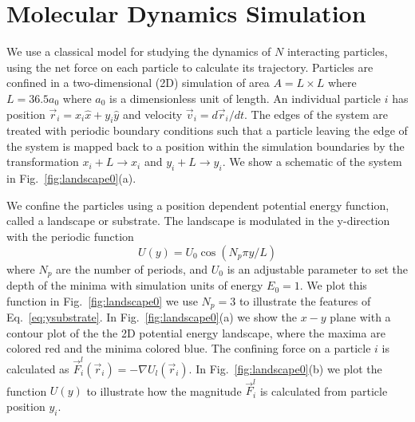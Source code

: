 \documentclass[twocolumn,preprintnumbers,amsmath,amssymb,aps,prx]{revtex4}
\begin{document}

\section{Molecular Dynamics Simulation}
\label{sec:MD}

We use a classical model for 
studying the dynamics of $N$ interacting particles,
using the net force on each particle to calculate
its trajectory.
Particles are confined in a two-dimensional (2D) 
simulation of area $A = L \times L$ where $L=36.5 a_0$
where $a_0$ is a dimensionless unit of length.
An individual particle $i$ has
position $\vec{r}_i = x_i \hat{x} + y_i \hat{y}$
and velocity $\vec{v}_i = d\vec{r}_i/dt$.
The edges of the system are treated with
periodic boundary conditions
such that a particle leaving the edge of the system is mapped
back to a position within the simulation boundaries 
by the transformation $x_i+L \rightarrow x_i$ and $y_i+L \rightarrow y_i$.
We show a schematic of the system in Fig.~\ref{fig:landscape0}(a).

We confine the particles using a position dependent 
potential energy function, called a landscape or substrate.
% 
The landscape is modulated in the y-direction
with the periodic function 
 \begin{equation}
   U(y) = U_0 \cos{(N_p \pi y / L)}
     \label{eq:ysubstrate}
\end{equation}
 where $N_p$ are the number of periods,
 and $U_0$ is an adjustable parameter
 to set the depth of the minima
 with simulation units of energy $E_0 = 1$. 
 We plot this function in 
 Fig.~\ref{fig:landscape0}
 we use $N_p = 3$ to illustrate the features of
 Eq.~\ref{eq:ysubstrate}.
 In Fig.~\ref{fig:landscape0}(a) we show 
 the $x-y$ plane with a contour plot
 of the the 2D potential energy landscape,
 where 
 the maxima are colored red and the minima colored blue.
 The confining force on a particle $i$
 is calculated as 
 $\vec{F}^{l}_i(\vec{r}_i) = -\nabla U_l(\vec{r}_i)$.
 In Fig.~\ref{fig:landscape0}(b) we plot the function
 $U(y)$ to illustrate how the magnitude
 $\vec{F}^{l}_i$ is calculated from particle position $y_i$.  
 
\end{document}
